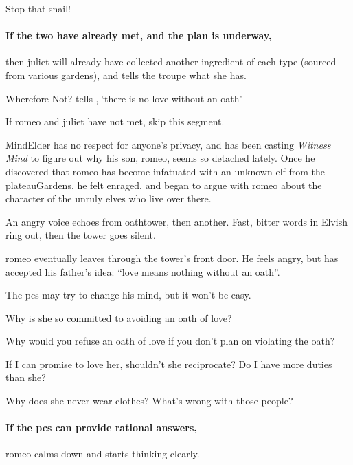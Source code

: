 \begin{speechtext}
  Stop that snail!
\end{speechtext}

\paragraph{If the two have already met, and the plan is underway,}
then \gls{juliet} will already have collected another \gls{ingredient} of each type (sourced from various gardens), and tells the troupe what she has.

{Wherefore Not?}%
{ tells , `there is no love without an oath'}%

If \gls{romeo} and \gls{juliet} have not met, skip this \gls{segment}.

\Gls{MindElder} has no respect for anyone's privacy, and has been \gls{casting} \textit{Witness Mind} to figure out why his son, \gls{romeo}, seems so detached lately.
Once he discovered that \gls{romeo} has become infatuated with an unknown elf from the \gls{plateauGardens}, he felt enraged, and began to argue with \gls{romeo} about the character of the unruly elves who live over there.

\begin{boxtext}
  An angry voice echoes from \gls{oathtower}, then another.
  Fast, bitter words in Elvish ring out, then the tower goes silent.
\end{boxtext}

\Gls{romeo} eventually leaves through the tower's front door.
He feels angry, but has accepted his father's idea: ``love means nothing without an oath''.

The \glspl{pc} may try to change his mind, but it won't be easy.

\begin{speechtext}
  Why is she so committed to avoiding an oath of love?

  Why would you refuse an oath of love if you don't plan on violating the oath?

  If I can promise to love her, shouldn't she reciprocate?
  Do I have more duties than she?

  Why does she never wear clothes?
  What's wrong with those people?
\end{speechtext}

\paragraph{If the \glspl{pc} can provide rational answers,}
\gls{romeo} calms down and starts thinking clearly.

